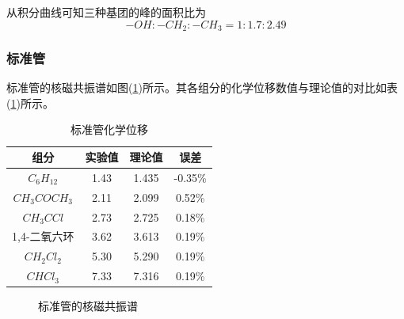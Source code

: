 \documentclass[a4paper]{article}
\begin{document}
从积分曲线可知三种基团的峰的面积比为
\begin{equation*}
-OH : -CH_2 : -CH_3 = 1 : 1.7 : 2.49
\end{equation*}

\newpage
\subsubsection{标准管}
标准管的核磁共振谱如图(\ref{3standard})所示。其各组分的化学位移数值与理论值的对比如表(\ref{table1})所示。

\begin{table}[!h]
\centering
\caption{标准管化学位移}
\label{table1}
\begin{tabular}{|c|c|c|c|}
\hline
组分 & 实验值  & 理论值   & 误差      \\ \hline
$C_6H_{12}$   & 1.43 & 1.435 & -0.35\% \\ \hline
$CH_3COCH_3$   & 2.11 & 2.099 & 0.52\%  \\ \hline
$CH_3CCl$   & 2.73 & 2.725 & 0.18\%  \\ \hline
1,4-二氧六环   & 3.62 & 3.613 & 0.19\%  \\ \hline
$CH_2Cl_2$   & 5.30 & 5.290 & 0.19\%  \\ \hline
$CHCl_3$   & 7.33 & 7.316 & 0.19\%  \\ \hline
\end{tabular}
\end{table}

\begin{figure}[!h]
\centering
\caption{标准管的核磁共振谱}\label{3standard}
\end{figure}

\newpage
\end{document}
